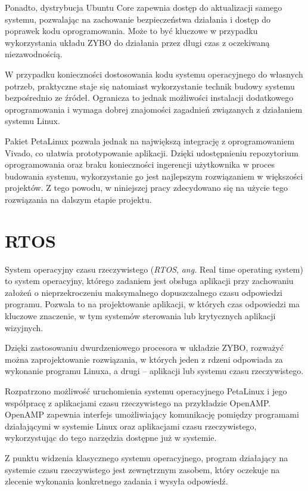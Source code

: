 Ponadto, dystrybucja Ubuntu Core zapewnia dostęp do aktualizacji samego systemu, pozwalając na zachowanie bezpieczeństwa działania i dostęp do poprawek kodu oprogramowania. Może to być kluczowe w przypadku wykorzystania układu ZYBO do działania przez długi czas z oczekiwaną niezawodnością.

W przypadku konieczności dostosowania kodu systemu operacyjnego do własnych potrzeb, praktyczne staje się natomiast wykorzystanie technik budowy systemu bezpośrednio ze źródeł. Ogranicza to jednak możliwości instalacji dodatkowego oprogramowania i wymaga dobrej znajomości zagadnień związanych z działaniem systemu Linux.

Pakiet PetaLinux pozwala jednak na największą integrację z oprogramowaniem Vivado, co ułatwia prototypowanie aplikacji. Dzięki udostępnieniu repozytorium oprogramowania oraz braku konieczności ingerencji użytkownika w proces budowania systemu, wykorzystanie go jest najlepszym rozwiązaniem w większości projektów. Z tego powodu, w niniejszej pracy zdecydowano się na użycie tego rozwiązania na dalszym etapie projektu.

\section{RTOS}
System operacyjny czasu rzeczywistego (\emph{RTOS}, \emph{ang.} Real time operating system) to system operacyjny, którego zadaniem jest obsługa aplikacji przy zachowaniu założeń o nieprzekroczeniu maksymalnego dopuszczalnego czasu odpowiedzi programu. Pozwala to na projektowanie aplikacji, w których czas odpowiedzi ma kluczowe znaczenie, w tym systemów sterowania lub krytycznych aplikacji wizyjnych.

Dzięki zastosowaniu dwurdzeniowego procesora w układzie ZYBO, rozważyć można zaprojektowanie rozwiązania, w których jeden z rdzeni odpowiada za wykonanie programu Linuxa, a drugi -- aplikacji lub systemu czasu rzeczywistego.

Rozpatrzono możliwość uruchomienia systemu operacyjnego PetaLinux i jego współpracę z aplikacjami czasu rzeczywistego na przykładzie OpenAMP. \cite{openamp-home} OpenAMP zapewnia interfejs umożliwiający komunikację pomiędzy programami działającymi w systemie Linux oraz aplikacjami czasu rzeczywistego, wykorzystując do tego narzędzia dostępne już w systemie.

Z punktu widzenia klasycznego systemu operacyjnego, program działający na systemie czasu rzeczywistego jest zewnętrznym zasobem, który oczekuje na zlecenie wykonania konkretnego zadania i wysyła odpowiedź.

